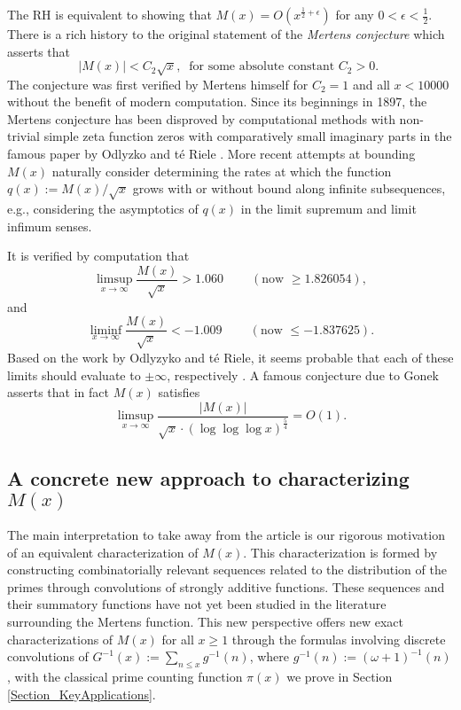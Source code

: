 \documentclass[11pt,reqno,a4letter]{article}
\numberwithin{figure}{section}
\numberwithin{table}{section}
\newcommand{\cf}{\textit{cf.\ }}
\newcommand{\seqnum}[1]{\href{http://oeis.org/#1}{\color{ProcessBlue}{\underline{#1}}}}
\theoremstyle{plain}
\numberwithin{theorem}{section}
\theoremstyle{definition}
\begin{document}
The RH is equivalent to showing that 
$M(x) = O\left(x^{\frac{1}{2}+\epsilon}\right)$ for any 
$0 < \epsilon < \frac{1}{2}$. 
There is a rich history to the original statement of the \emph{Mertens conjecture} which 
asserts that 
\[ 
|M(x)| < C_2 \sqrt{x},\ \text{ for some absolute constant $C_2 > 0$. }
\] 
The conjecture was first verified by Mertens himself for $C_2 = 1$ and all $x < 10000$ 
without the benefit of modern computation. 
Since its beginnings in 1897, the Mertens conjecture has been disproved by computational methods with
non-trivial simple zeta function zeros with comparatively small imaginary parts in the famous paper by 
Odlyzko and t\'{e} Riele \cite{ODLYZ-TRIELE}. 
More recent attempts 
at bounding $M(x)$ naturally consider determining the rates at which the function 
$q(x) := M(x) / \sqrt{x}$ grows with or without bound along infinite 
subsequences, e.g., considering the asymptotics of $q(x)$ 
in the limit supremum and limit infimum senses. 

It is verified by computation 
that \cite[\cf \S 4.1]{PRIMEREC} 
\cite[\cf \seqnum{A051400}; \seqnum{A051401}]{OEIS} 
\[
\limsup_{x\rightarrow\infty} \frac{M(x)}{\sqrt{x}} > 1.060\ \qquad (\text{now } \geq 1.826054), 
\] 
and 
\[ 
\liminf_{x\rightarrow\infty} \frac{M(x)}{\sqrt{x}} < -1.009\ \qquad (\text{now } \leq -1.837625). 
\] 
Based on the work by Odlyzyko and t\'{e} Riele, it seems probable that 
each of these limits should evaluate to $\pm \infty$, respectively 
\cite{ODLYZ-TRIELE,MREVISITED,ORDER-MERTENSFN,HURST-2017}. 
A famous conjecture due to Gonek asserts that in fact 
$M(x)$ satisfies \cite{NG-MERTENS}
$$\limsup_{x \rightarrow \infty} \frac{|M(x)|}{\sqrt{x} \cdot (\log\log\log x)^{\frac{5}{4}}} = O(1).$$ 

\subsection{A concrete new approach to characterizing $M(x)$} 

The main interpretation to take away from the article is 
our rigorous motivation of an 
equivalent characterization of $M(x)$. This characterization is formed by constructing 
combinatorially relevant sequences related to the distribution of the primes 
through convolutions of strongly additive functions. 
These sequences and their summatory functions 
have not yet been studied in the literature surrounding the Mertens function. 
This new perspective offers new exact characterizations of $M(x)$ for all $x \geq 1$ 
through the formulas involving discrete convolutions of 
$G^{-1}(x) := \sum_{n \leq x} g^{-1}(n)$, where $g^{-1}(n) := (\omega+1)^{-1}(n)$, with the 
classical prime counting function $\pi(x)$ we prove in 
Section \ref{Section_KeyApplications}. 
\end{document}
